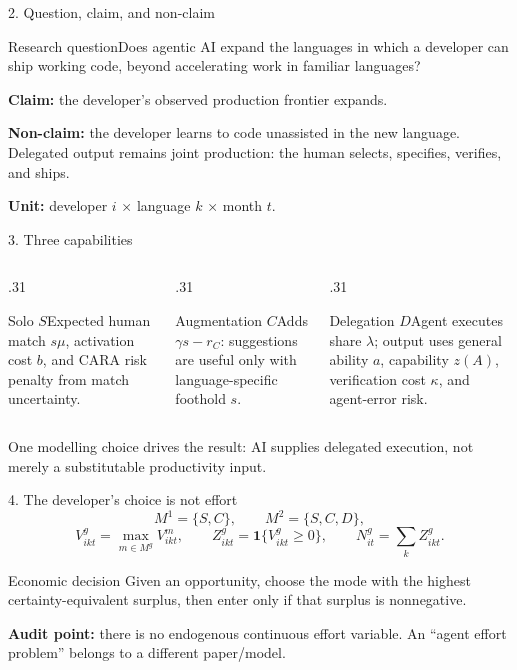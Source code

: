 \documentclass[aspectratio=169,10pt]{beamer}
\begin{document}
\begin{frame}{2. Question, claim, and non-claim}
\begin{block}{Research question}Does agentic AI expand the languages in which a developer can ship working code, beyond accelerating work in familiar languages?\end{block}
\vspace{.5em}
\textbf{Claim:} the developer's observed \alert{production frontier} expands.
\vspace{.5em}

\textbf{Non-claim:} the developer learns to code unassisted in the new language. Delegated output remains joint production: the human selects, specifies, verifies, and ships.
\vspace{.5em}

\textbf{Unit:} developer $i$ × language $k$ × month $t$.
\end{frame}

\begin{frame}{3. Three capabilities}
\begin{columns}[T,onlytextwidth]
\begin{column}{.31\textwidth}\begin{block}{Solo $S$}Expected human match $s\mu$, activation cost $b$, and CARA risk penalty from match uncertainty.\end{block}\end{column}
\begin{column}{.31\textwidth}\begin{block}{Augmentation $C$}Adds $\gamma s-r_C$: suggestions are useful only with language-specific foothold $s$.\end{block}\end{column}
\begin{column}{.31\textwidth}\begin{block}{Delegation $D$}Agent executes share $\lambda$; output uses general ability $a$, capability $z(A)$, verification cost $\kappa$, and agent-error risk.\end{block}\end{column}
\end{columns}
\vspace{.8em}
\centering\large One modelling choice drives the result: \alert{AI supplies delegated execution, not merely a substitutable productivity input.}
\end{frame}

\begin{frame}{4. The developer's choice is not effort}
\[
M^1=\{S,C\},\qquad M^2=\{S,C,D\},
\]
\[
V^g_{ikt}=\max_{m\in M^g}V^m_{ikt},\qquad
Z^g_{ikt}=\mathbf 1\{V^g_{ikt}\ge0\},\qquad N^g_{it}=\sum_k Z^g_{ikt}.
\]
\begin{block}{Economic decision}
Given an opportunity, choose the mode with the highest certainty-equivalent surplus, then enter only if that surplus is nonnegative.
\end{block}
\textbf{Audit point:} there is no endogenous continuous effort variable. An “agent effort problem” belongs to a different paper/model.
\end{frame}
\end{document}
